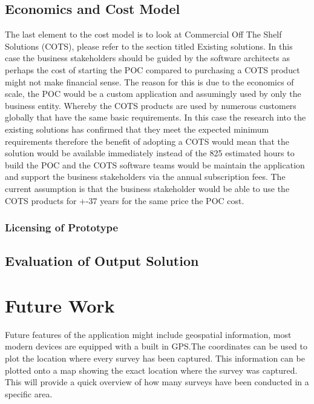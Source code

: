\documentclass[12pt]{witseiepaper}
\begin{document}
\subsection{Economics and Cost Model}
The last element to the cost model is to look at Commercial Off The Shelf Solutions (COTS),  please refer to the section titled Existing solutions. In this case the business stakeholders should be guided by the software architects as perhaps the cost of starting the POC compared to purchasing a COTS product might not make financial sense. The reason for this is due to the economics of scale, the POC would be a custom application and assumingly used by only the business entity. Whereby the COTS products are used by numerous customers globally that have the same basic requirements. In this case the research into the existing solutions has confirmed that they meet the expected minimum requirements therefore the benefit of adopting a COTS would mean that the solution would be available immediately instead of the 825 estimated hours to build the POC and the COTS software teams would be maintain the application and support the business stakeholders via the annual subscription fees. The current assumption is that the business stakeholder would be able to use the COTS products for +-37 years for the same price the POC cost.


\subsubsection{Licensing of Prototype}


\subsection{Evaluation of Output Solution}


\section{Future Work}
Future features of the application might include geospatial information, most modern devices are equipped with a built in GPS.The coordinates can be used to plot the location where every survey has been captured. This information can be plotted onto a map showing the exact location where the survey was captured. This will provide a quick overview of how many surveys have been conducted in a specific area.


\end{document}
